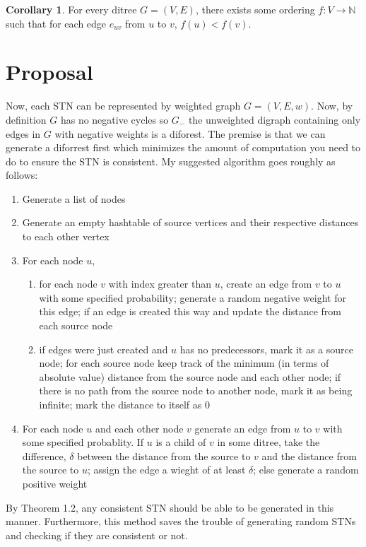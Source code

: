 \documentclass[12pt]{article}
\newcommand{\N}{\mathbb{N}}
\theoremstyle{remark}
\theoremstyle{definition}
\newtheorem{corollary}{Corollary}[theorem]
\begin{document}
\begin{corollary}For every ditree $G = (V,E)$, there exists some ordering $f: V \to \N$ such that for each edge $e_{uv}$ from $u$ to $v$, $f(u) < f(v)$. 
\end{corollary}

\section{Proposal}

Now, each STN can be represented by weighted graph $G = (V, E, w)$. Now, by definition $G$ has no negative cycles so $G_-$ the unweighted digraph containing only edges in $G$ with negative weights is a diforest. The premise is that we can generate a diforrest first which minimizes the amount of computation you need to do to ensure the STN is consistent. My suggested algorithm goes roughly as follows:

\begin{enumerate}
\item Generate a list of nodes
\item Generate an empty hashtable of source vertices and their respective distances to each other vertex
\item For each node $u$,
	 \begin{enumerate} 
	 	\item for each node $v$ with index greater than $u$, create an edge from $v$ to $u$ with some specified probability; generate a random negative weight for this edge; if an edge is created this way and update the distance from each source node
	 	\item if edges were just created and $u$ has no predecessors, mark it as a source node; for each source node keep track of the minimum (in terms of absolute value) distance from the source node and each other node; if there is no path from the source node to another node, mark it as being infinite; mark the distance to itself as 0
	\end{enumerate}
\item For each node $u$ and each other node $v$ generate an edge from $u$ to $v$ with some specified probablity. If $u$ is a child of $v$ in some ditree, take the difference, $\delta$ between the distance from the source to $v$ and the distance from the source to $u$; assign the edge a wieght of at least $\delta$; else generate a random positive weight
\end{enumerate}

By Theorem 1.2, any consistent STN should be able to be generated in this manner. Furthermore, this method saves the trouble of generating random STNs and checking if they are consistent or not.
\end{document}
